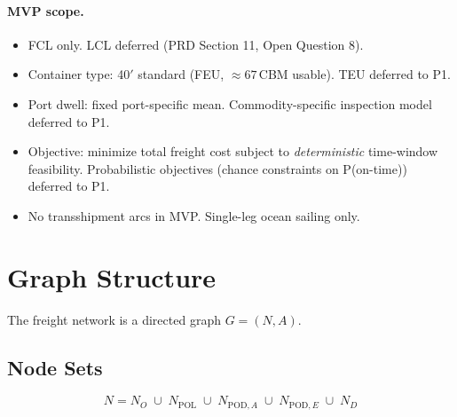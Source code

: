 \documentclass[11pt,a4paper]{article}
\theoremstyle{definition}
\begin{document}
\paragraph{MVP scope.}
\begin{itemize}[noitemsep]
  \item FCL only. LCL deferred (PRD Section 11, Open Question 8).
  \item Container type: 40$'$ standard (FEU, $\approx 67$\,CBM usable). TEU deferred to P1.
  \item Port dwell: fixed port-specific mean. Commodity-specific inspection model deferred to P1.
  \item Objective: minimize total freight cost subject to \emph{deterministic} time-window feasibility.
        Probabilistic objectives (chance constraints on P(on-time)) deferred to P1.
  \item No transshipment arcs in MVP. Single-leg ocean sailing only.
\end{itemize}

\section{Graph Structure}

The freight network is a directed graph $G = (N, A)$.

\subsection{Node Sets}

\[
  N = N_O \;\cup\; N_{\text{POL}} \;\cup\; N_{\text{POD},A} \;\cup\; N_{\text{POD},E} \;\cup\; N_D
\]
\end{document}

